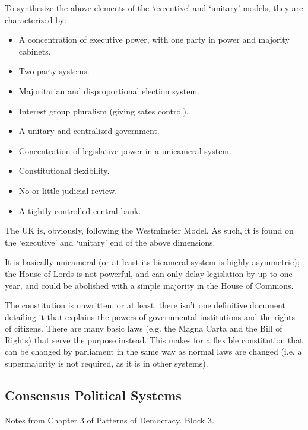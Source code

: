 
To synthesize the above elements of the `executive' and `unitary'
models, they are characterized by:
\begin{itemize}
  \item A concentration of executive power, with one party in power and
    majority cabinets.
  \item Two party systems.
  \item Majoritarian and disproportional election system.
  \item Interest group pluralism (giving sates control).
  \item A unitary and centralized government.
  \item Concentration of legislative power in a unicameral system.
  \item Constitutional flexibility.
  \item No or little judicial review.
  \item A tightly controlled central bank.
\end{itemize}

The UK is, obviously, following the Westminster Model. As such, it is
found on the `executive' and `unitary' end of the above dimensions.

It is basically unicameral (or at least its bicameral system is highly
asymmetric); the House of Lords is not powerful, and can only delay
legislation by up to one year, and could be abolished with a simple
majority in the House of Commons.

The constitution is unwritten, or at least, there isn't one definitive
document detailing it that explains the powers of governmental
institutions and the rights of citizens. There are many basic laws
(e.g. the Magna Carta and the Bill of Rights) that serve the purpose
instead. This makes for a flexible constitution that can be changed by
parliament in the same way as normal laws are changed (i.e. a
supermajority is not required, as it is in other systems).

\subsection{Consensus Political Systems}
\begin{flushright}
  \scriptsize Notes from Chapter 3 of Patterns of Democracy. Block 3.
\end{flushright}

